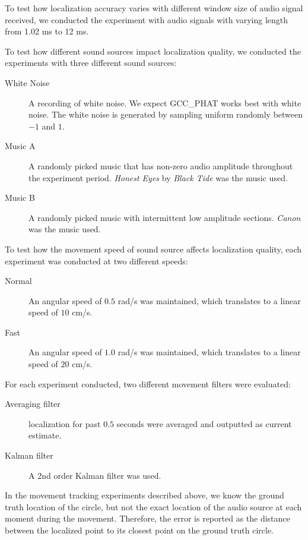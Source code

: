 To test how localization accuracy varies with different window size of audio signal received, we conducted the experiment with audio signals with varying length from 1.02 ms to 12 ms.

To test how different sound sources impact localization quality, we conducted the experiments with three different sound sources:
\begin{description}%

\item[White Noise] A recording of white noise. We expect GCC\_PHAT works best with white noise. The white noise is generated by sampling uniform randomly between $-1$ and $1$.

\item[Music A] A randomly picked music that has non-zero audio amplitude throughout the experiment period. \emph{Honest Eyes} by \emph{Black Tide} was the music used.

\item[Music B] A randomly picked music with intermittent low amplitude sections. \emph{Canon} was the music used.

\end{description} 

To test how the movement speed of sound source affects localization quality, each experiment was conducted at two different speeds:

\begin{description}
\item[Normal] An angular speed of $0.5$ rad/s was maintained, which translates to a linear speed of $10$ cm/s.
\item[Fast] An angular speed of $1.0$ rad/s was maintained, which translates to a linear speed of $20$ cm/s.
\end{description}

For each experiment conducted, two different movement filters were evaluated:
\begin{description}%
\item[Averaging filter] localization for past $0.5$ seconds were averaged and outputted as current estimate.
\item[Kalman filter] A 2nd order Kalman filter was used.
\end{description}

In the movement tracking experiments described above, we know the ground truth location of the circle, but not the exact location of the audio source at each moment during the movement. Therefore, the error is reported as the distance between the localized point to its closest point on the ground truth circle.
\clearpage

